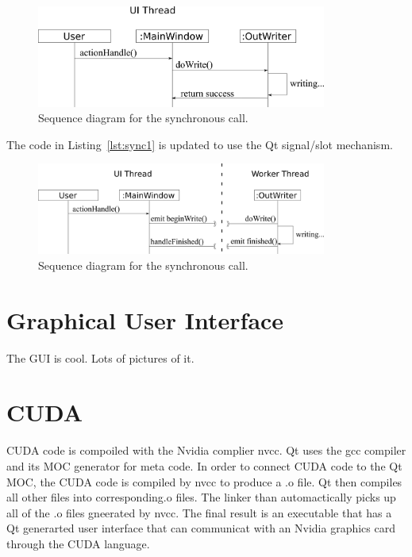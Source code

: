 \begin{figure}[tb]
  \begin{center}
   \includegraphics[width=3.75in]{figs/writer_sync}
  \end{center}
  \caption{Sequence diagram for the synchronous call.}
\label{fig:sync1}
\end{figure}%

The code in Listing~\ref{lst:sync1} is updated to use the Qt signal/slot mechanism.

\begin{figure}[tb]
  \begin{center}
   \includegraphics[width=3.75in]{figs/writer_async}
  \end{center}
  \caption{Sequence diagram for the synchronous call.}
\label{fig:async1}
\end{figure}%

\section{Graphical User Interface}\label{sec:gui}

The GUI is cool. Lots of pictures of it.

\section{CUDA}\label{sec:cuda}
CUDA code is compoiled with the Nvidia complier nvcc. Qt uses the gcc compiler and its MOC generator for meta code. In order to connect CUDA code to the Qt MOC, the CUDA code is compiled by nvcc to produce a .o file. Qt then compiles all other files into corresponding.o files. The linker than automactically picks up all of the .o files gneerated by nvcc. The final result is an executable that has a Qt generarted user interface that can communicat with an Nvidia graphics card through the CUDA language.

